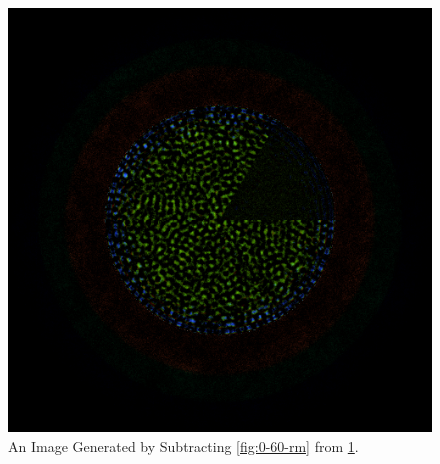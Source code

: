 \begin{figure}[h!]
\centering
\includegraphics[width=0.6\linewidth]{figures/htgr-diff}
\caption{An Image Generated by Subtracting \ref{fig:0-60-rm} from \ref{fig:htgr-diff}.}
\label{fig:htgr-diff}
\end{figure}